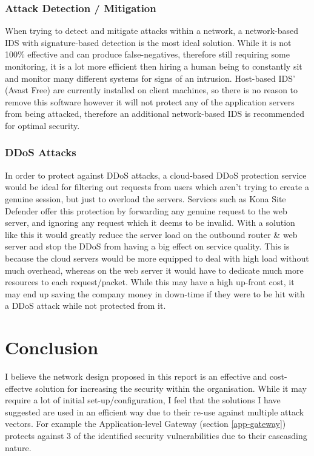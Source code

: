 \documentclass[11pt]{article}
\begin{document}
        \subsubsection{Attack Detection / Mitigation}
          When trying to detect and mitigate attacks within a network, a network-based IDS with signature-based detection is the most ideal solution. While it is not 100\% effective and can produce false-negatives, therefore still requiring some monitoring, it is a lot more efficient then hiring a human being to constantly sit and monitor many different systems for signs of an intrusion. Host-based IDS' (Avast Free) are currently installed on client machines, so there is no reason to remove this software however it will not protect any of the application servers from being attacked, therefore an additional network-based IDS is recommended for optimal security.

        \subsubsection{DDoS Attacks}
          In order to protect against DDoS attacks, a cloud-based DDoS protection service would be ideal for filtering out requests from users which aren't trying to create a genuine session, but just to overload the servers. Services such as Kona Site Defender \citep{akamai2018defender} offer this protection by forwarding any genuine request to the web server, and ignoring any request which it deems to be invalid. With a solution like this it would greatly reduce the server load on the outbound router \& web server and stop the DDoS from having a big effect on service quality. This is because the cloud servers would be more equipped to deal with high load without much overhead, whereas on the web server it would have to dedicate much more resources to each request/packet. While this may have a high up-front cost, it may end up saving the company money in down-time if they were to be hit with a DDoS attack while not protected from it.

    \section{Conclusion}
      I believe the network design proposed in this report is an effective and cost-effectve solution for increasing the security within the organisation. While it may require a lot of initial set-up/configuration, I feel that the solutions I have suggested are used in an efficient way due to their re-use against multiple attack vectors. For example the Application-level Gateway (section \ref{app-gateway}) protects against 3 of the identified security vulnerabilities due to their cascasding nature.
\end{document}
